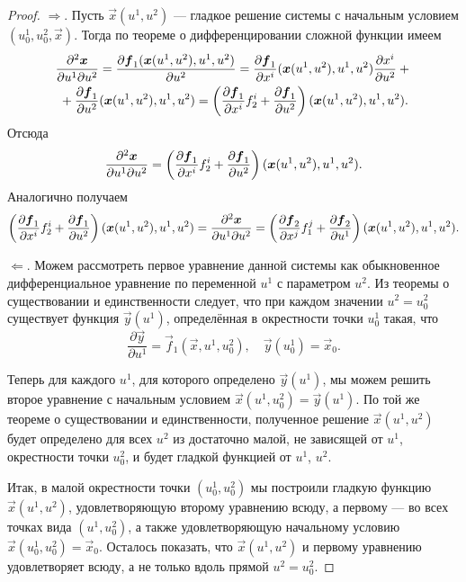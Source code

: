 \begin{proof}
	$\Rightarrow$. Пусть $\vec{x}(u^1, u^2)$ --- гладкое решение системы с начальным условием $(u^1_0, u^2_0, \vec{x})$. Тогда по теореме о дифференцировании сложной функции имеем
	\begin{multline*}
		\frac{\partial^2\boldsymbol{x}}{\partial u^1\partial u^2} = \frac{\partial\boldsymbol{f}_1(\boldsymbol{x}(u^1, u^2), u^1, u^2)}{\partial u^2} = \frac{\partial\boldsymbol{f}_1}{\partial x^i}(\boldsymbol{x}(u^1, u^2), u^1, u^2)\frac{\partial x^i}{\partial u^2} + {}\\{} + \frac{\partial\boldsymbol{f}_1}{\partial u^2}(\boldsymbol{x}(u^1, u^2), u^1, u^2) = \left(\frac{\partial\boldsymbol{f}_1}{\partial x^i}f_2^i + \frac{\partial\boldsymbol{f}_1}{\partial u^2}\right)(\boldsymbol{x}(u^1, u^2), u^1, u^2).
	\end{multline*}
	Отсюда
	\[
		\frac{\partial^2\boldsymbol{x}}{\partial u^1\partial u^2} = \left(\frac{\partial\boldsymbol{f}_1}{\partial x^i}f_2^i + \frac{\partial\boldsymbol{f}_1}{\partial u^2}\right)(\boldsymbol{x}(u^1, u^2), u^1, u^2).
	\]
	Аналогично получаем
	\[
		\left(\frac{\partial\boldsymbol{f}_1}{\partial x^i}f_2^i + \frac{\partial\boldsymbol{f}_1}{\partial u^2}\right)(\boldsymbol{x}(u^1, u^2), u^1, u^2) = \frac{\partial^2\boldsymbol{x}}{\partial u^1\partial u^2} = \left(\frac{\partial\boldsymbol{f}_2}{\partial x^j}f_1^j + \frac{\partial\boldsymbol{f}_2}{\partial u^1}\right)(\boldsymbol{x}(u^1, u^2), u^1, u^2).
	\]

	$\Leftarrow$. Можем рассмотреть первое уравнение данной системы как обыкновенное дифференциальное уравнение по переменной $u^1$ с параметром $u^2$. Из теоремы о существовании и единственности следует, что при каждом значении $u^2 = u^2_0$ существует функция $\vec{y}(u^1)$, определённая в окрестности точки $u^1_0$ такая, что
	\[
		\frac{\partial\vec{y}}{\partial u^1} = \vec{f}_1(\vec{x}, u^1, u^2_0),\quad\vec{y}(u^1_0) = \vec{x}_0.
	\]

	Теперь для каждого $u^1$, для которого определено $\vec{y}(u^1)$, мы можем решить второе уравнение с начальным условием $\vec{x}(u^1, u_0^2) = \vec{y}(u^1)$. По той же теореме о существовании и единственности, полученное решение $\vec{x}(u^1, u^2)$ будет определено для всех $u^2$ из достаточно малой, не зависящей от $u^1$, окрестности точки $u^2_0$, и будет гладкой функцией от $u^1$, $u^2$.

	Итак, в малой окрестности точки $(u^1_0, u^2_0)$ мы построили гладкую функцию $\vec{x}(u^1, u^2)$, удовлетворяющую второму уравнению всюду, а первому --- во всех точках вида $(u^1, u^2_0)$, а также удовлетворяющую начальному условию $\vec{x}(u^1_0, u^2_0) = \vec{x}_0$. Осталось показать, что $\vec{x}(u^1, u^2)$ и первому уравнению удовлетворяет всюду, а не только вдоль прямой $u^2 = u^2_0$.


\end{proof}
